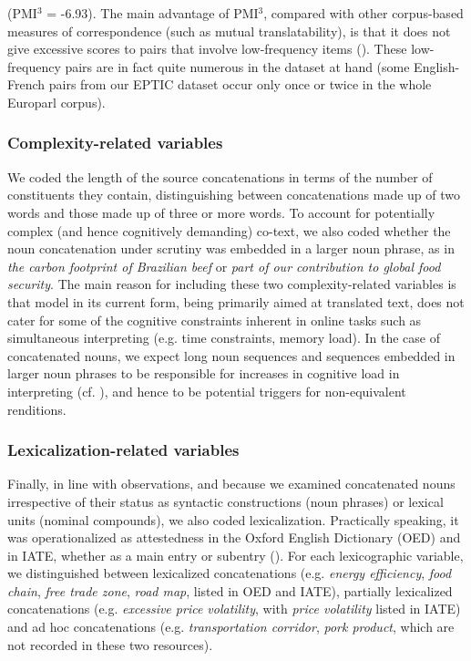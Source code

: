 \documentclass[output=paper]{langscibook}
\begin{document}
(PMI$^3$ = -6.93). The main advantage of PMI$^3$, compared with other corpus-based measures of correspondence (such as  mutual translatability), is that it does not give excessive scores to pairs that involve low-frequency items (\citealt{RoleNadif2011}). These low-frequency pairs are in fact quite numerous in the dataset at hand (some English-French pairs from our EPTIC dataset occur only once or twice in the whole Europarl corpus). 

\subsubsection{Complexity-related variables}\label{sec:lefer:3.2.4}

We coded the length of the source concatenations in terms of the number of constituents they contain, distinguishing between concatenations made up of two words and those made up of three or more words. To account for potentially complex (and hence cognitively demanding) co-text, we also coded whether the noun concatenation under scrutiny was embedded in a larger noun phrase, as in \textit{the carbon footprint of Brazilian beef} or \textit{part of our contribution to global food security}. The main reason for including these two complexity-related variables is that  model in its current form, being primarily aimed at translated text, does not cater for some of the cognitive constraints inherent in online tasks such as simultaneous interpreting (e.g. time constraints, memory load). In the case of concatenated nouns, we expect long noun sequences and sequences embedded in larger noun phrases to be responsible for increases in cognitive load in interpreting (cf. \citealt{DefrancqPlevoets2018}), and hence to be potential triggers for non-equivalent renditions.

\subsubsection{Lexicalization-related variables}\label{sec:lefer:3.2.5}

Finally, in line with  observations, and because we examined concatenated nouns irrespective of their status as syntactic constructions (noun phrases) or lexical units (nominal compounds), we also coded lexicalization. Practically speaking, it was operationalized as attestedness in the Oxford English Dictionary (OED) and in IATE, whether as a main entry or subentry (\citealt[cf.][]{Hilpert2019}). For each lexicographic variable, we distinguished between lexicalized concatenations (e.g. \textit{energy efficiency}, \textit{food chain}, \textit{free trade zone}, \textit{road map}, listed in OED and IATE), partially lexicalized concatenations (e.g. \textit{excessive price volatility}, with \textit{price volatility} listed in IATE) and ad hoc concatenations (e.g. \textit{transportation corridor}, \textit{pork product}, which are not recorded in these two resources).
\end{document}
